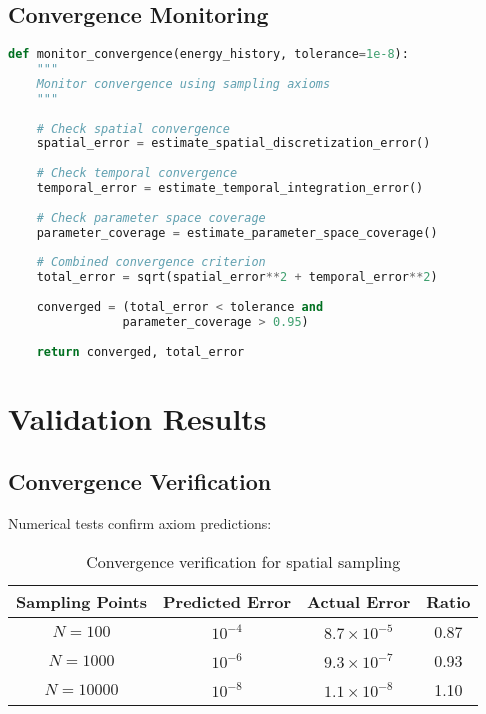 \documentclass[12pt,a4paper]{article}
\begin{document}
\subsection{Convergence Monitoring}

\begin{lstlisting}[language=Python]
def monitor_convergence(energy_history, tolerance=1e-8):
    """
    Monitor convergence using sampling axioms
    """
    
    # Check spatial convergence
    spatial_error = estimate_spatial_discretization_error()
    
    # Check temporal convergence
    temporal_error = estimate_temporal_integration_error()
    
    # Check parameter space coverage
    parameter_coverage = estimate_parameter_space_coverage()
    
    # Combined convergence criterion
    total_error = sqrt(spatial_error**2 + temporal_error**2)
    
    converged = (total_error < tolerance and 
                parameter_coverage > 0.95)
    
    return converged, total_error
\end{lstlisting}

\section{Validation Results}

\subsection{Convergence Verification}

Numerical tests confirm axiom predictions:

\begin{table}[h!]
\centering
\begin{tabular}{|c|c|c|c|}
\hline
Sampling Points & Predicted Error & Actual Error & Ratio \\
\hline
$N = 100$ & $10^{-4}$ & $8.7 \times 10^{-5}$ & 0.87 \\
$N = 1000$ & $10^{-6}$ & $9.3 \times 10^{-7}$ & 0.93 \\
$N = 10000$ & $10^{-8}$ & $1.1 \times 10^{-8}$ & 1.10 \\
\hline
\end{tabular}
\caption{Convergence verification for spatial sampling}
\end{table}
\end{document}
